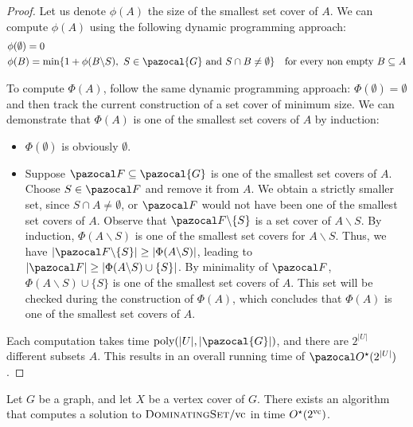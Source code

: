 \begin{proof}
    Let us denote $\phi(A)$ the size of the smallest set cover of $A$. We can compute $\phi(A)$ using the following dynamic programming approach:
    \begin{align*}
        &\phi(\emptyset) = 0\\
        &\phi(B) = \min\{1 + \phi(B \backslash S),\ S \in \pazocal{G} \text{ and } S \cap B \neq \emptyset\} & \text{for every non empty } B \subseteq A
    \end{align*}
    
    To compute $\Phi(A)$, follow the same dynamic programming approach: $\Phi(\emptyset) = \emptyset$ and then track the current construction of a set cover of minimum size. We can demonstrate that $\Phi(A)$ is one of the smallest set covers of $A$ by induction:
    \begin{itemize}
        \item $\Phi(\emptyset)$ is obviously $\emptyset$.
        \item Suppose $\F \subseteq \pazocal{G}$ is one of the smallest set covers of $A$. Choose $S \in \F$ and remove it from $A$. We obtain a strictly smaller set, since $S \cap A \neq \emptyset$, or $\F$ would not have been one of the smallest set covers of $A$. Observe that $\F \backslash \{S\}$ is a set cover of $A \backslash S$. By induction, $\Phi(A \backslash S)$ is one of the smallest set covers for $A \backslash S$. Thus, we have $|\F \backslash \{S\}| \geq |\Phi(A \backslash S)|$, leading to $|\F| \geq |\Phi(A \backslash S) \cup \{S\}|$. By minimality of $\F$, $\Phi(A \backslash S) \cup \{S\}$ is one of the smallest set covers of $A$. This set will be checked during the construction of $\Phi(A)$, which concludes that $\Phi(A)$ is one of the smallest set covers of $A$.
    \end{itemize}
    
    Each computation takes time $\poly(|U|, |\pazocal{G}|)$, and there are $2^{|U|}$ different subsets $A$. This results in an overall running time of $\O^\star(2^{|U|})$.
\end{proof}



\begin{theorem}
    \label{theorem:domset-vc}
    Let $G$ be a graph, and let $X$ be a vertex cover of $G$. There exists an algorithm that computes a solution to $\textsc{DominatingSet}/\text{vc}$ in time $O^\star(2^{\text{vc}})$.
\end{theorem}

